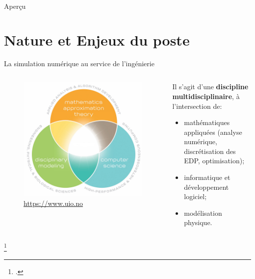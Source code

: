 \documentclass[aspectratio=169, french]{beamer}
\begin{document}
	
	
\begin{frame}[plain]
	
	
	
\end{frame}

	
	
\begin{frame}{Aperçu}
		
		\tableofcontents
		
\end{frame}

	
\section{Nature et Enjeux du poste}

\begin{frame}{La simulation numérique au service de l'ingénierie}
	
	\begin{columns}
		\begin{column}{.45\textwidth}
		\begin{figure}
			\includegraphics[width=.9\textwidth]{cse.jpg}
			\caption{\href{https://www.uio.no/english/studies/programmes/computational-science-master/why-choose/}{https://www.uio.no}}
		\end{figure}	
		\end{column}
		\begin{column}{.5\textwidth}
		Il s'agit d'une \textbf{discipline multidisciplinaire}, à l'intersection de\footnotemark :
		\begin{itemize}
			\item mathématiques appliquées (analyse numérique, discrétisation des EDP, optimisation);
			\item informatique et développement logiciel;
			\item modélisation physique.
		\end{itemize}
		
		\end{column}
	\end{columns}	
	\footcitetext{ulrich2018cse}
\end{frame}
\end{document}
